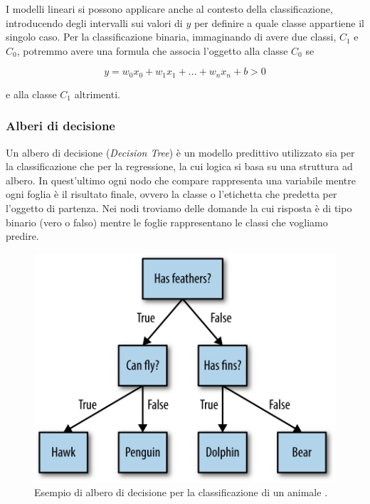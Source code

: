 \documentclass[a4paper,12pt]{report}
\begin{document}
I modelli lineari si possono applicare anche al contesto della classificazione, introducendo degli intervalli sui valori di $y$ per definire a quale classe appartiene il singolo caso. 
Per la classificazione binaria, immaginando di avere due classi, $C_1$ e $C_0$, potremmo avere una formula che associa l'oggetto alla classe $C_0$ se

\begin{equation*}
    y = w_0x_0 + w_1x_1 + \dots + w_nx_n + b > 0
\end{equation*}

\noindent e alla classe $C_1$ altrimenti.


\subsubsection{Alberi di decisione}

Un albero di decisione (\textit{Decision Tree}) è un modello predittivo utilizzato sia per la classificazione che per la regressione, la cui logica si basa su una struttura ad albero. In quest'ultimo ogni nodo che compare rappresenta una variabile mentre ogni foglia è il risultato finale, ovvero la classe o l'etichetta che predetta per l'oggetto di partenza.
Nei nodi troviamo delle domande la cui risposta è di tipo binario (vero o falso) mentre le foglie rappresentano le classi che vogliamo predire.

\begin{figure}[h]
    \centering
    \includegraphics[scale=0.35]{images/decisione_tree.png}
    \caption{Esempio di albero di decisione per la classificazione di un animale \cite{figure_copyright}.}
    \label{fig:decision_tree}

\end{figure}
\end{document}
